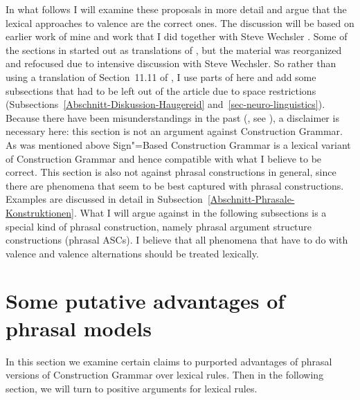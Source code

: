 In what follows I will examine these proposals in more detail and argue that the lexical approaches
to valence are the correct ones. The discussion will be based on earlier work of mine
\citep{Mueller2006d,Mueller2007d,MuellerPersian} and work that I did together with Steve Wechsler
\citep{MWArgSt,MWArgStReply}. Some of the sections in \citet{MWArgSt} started out as translations of
\citet{MuellerGTBuch2}, but the material was reorganized and refocused due to intensive discussion
with Steve Wechsler. So rather than using a translation of Section~11.11 of ,
I use parts of  here and add some subsections that had to be left out of the article
due to space restrictions (Subsections~\ref{Abschnitt-Diskussion-Haugereid} and~\ref{sec-neuro-linguistics}).
Because there have been misunderstandings in the past (\eg {}, see ), a disclaimer is necessary
here: this section is not an argument against Construction Grammar\indexcxg. As was mentioned above
Sign"=Based Construction Grammar is a lexical variant of Construction Grammar and hence compatible
with what I believe to be correct. This section is also not against phrasal constructions in
general, since there are phenomena that seem to be best captured with phrasal constructions. Examples are
discussed in detail in Subsection~\ref{Abschnitt-Phrasale-Konstruktionen}. What I will argue against in
the following subsections is a special kind of phrasal construction, namely phrasal argument
structure constructions (phrasal ASCs). I believe that all phenomena that have to do with valence and valence
alternations should be treated lexically.




\largerpage
\section{Some putative advantages of phrasal models}
\label{Abschnitt-Stoepselei}
%

In this section we examine certain claims to purported advantages of phrasal versions of Construction Grammar over lexical rules.  
Then in the following section, we will turn to positive arguments for lexical rules. 

